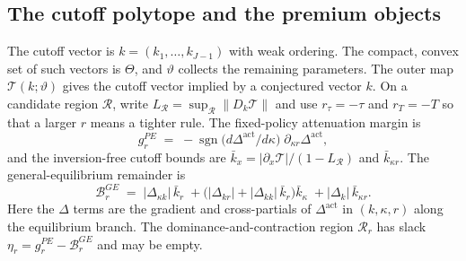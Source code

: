 \documentclass[11pt]{article}
\makeatletter
\newcommand{\compatlabel}[2]{\begingroup\phantomsection\def\@currentlabel{#1}\label{#2}\endgroup}
\newcommand{\Dact}{\Delta^{\mathrm{act}}}
\newcommand{\Tmap}{\mathcal{T}}
\makeatother
\begin{document}
\subsection{The cutoff polytope and the premium objects}
\label{sec:polytope}


The cutoff vector is $k=(k_1,\ldots,k_{J-1})$ with weak ordering. The compact, convex set of such
vectors is $\Theta$, and $\vartheta$ collects the remaining parameters. The outer map
$\Tmap(k;\vartheta)$ gives the cutoff vector implied by a conjectured vector $k$. On a candidate
region $\mathcal R$, write $L_{\mathcal R}=\sup_{\mathcal R}\lVert D_k\Tmap\rVert$ and use
$r_\tau=-\tau$ and $r_T=-T$ so that a larger $r$ means a tighter rule. The fixed-policy attenuation
margin is
\begin{equation}
\label{eq:gPE}
g_r^{PE} \;=\; -\operatorname{sgn}\!\bigl(d\Dact/d\kappa\bigr)\;\partial_{\kappa r}\Dact,
\end{equation}
and the inversion-free cutoff bounds are $\bar k_x=|\partial_x\Tmap|/(1-L_{\mathcal R})$ and
$\bar k_{\kappa r}$. The general-equilibrium remainder is
\begin{equation}
\label{eq:BGE}
\mathcal B_r^{GE} \;=\; |\Delta_{\kappa k}|\,\bar k_r
\;+
\bigl(|\Delta_{kr}|+|\Delta_{kk}|\,\bar k_r\bigr)\bar k_\kappa
\;+
|\Delta_k|\,\bar k_{\kappa r}.
\end{equation}
Here the $\Delta$ terms are the gradient and cross-partials of $\Dact$ in $(k,\kappa,r)$ along the
equilibrium branch. The dominance-and-contraction region $\mathcal R_r$ has slack
$\eta_r=g_r^{PE}-\mathcal B_r^{GE}$ and may be empty.\compatlabel{6}{def:theta}
\end{document}
